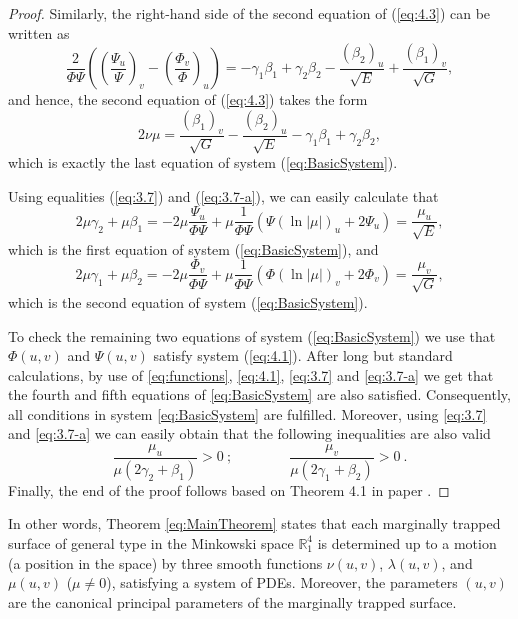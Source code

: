 \documentclass[12pt]{amsart}
\newcommand{\R}{\mathbb R}
\theoremstyle{definition}
\theoremstyle{remark}
\newcommand{\ds}{\displaystyle}
\numberwithin{equation}{section}
\begin{document}
\begin{proof}
Similarly, the right-hand side of the second equation of (\ref{eq:4.3}) can be written as
\begin{equation*}
	\ds \frac{2}{\Phi\Psi} \left( \left(\frac{\Psi_u}{\Psi} \right)_v - \left(\frac{\Phi_v}{\Phi} \right)_u \right)
	= -\gamma_1\beta_1 + \gamma_2\beta_2 - \frac{(\beta_2)_u}{\sqrt E} + \frac{(\beta_1)_v}{\sqrt G},
\end{equation*}
and hence,  the second equation of (\ref{eq:4.3}) takes the form
$$
2\nu\mu  = \frac{(\beta_1)_v}{\sqrt G} - \frac{(\beta_2)_u}{\sqrt E} -\gamma_1\beta_1 + \gamma_2\beta_2, 
$$
which is exactly the last equation of system (\ref{eq:BasicSystem}).

Using equalities (\ref{eq:3.7}) and (\ref{eq:3.7-a}), we can easily calculate that
$$
2\mu \gamma_2 + \mu \beta_1 = -2 \mu \frac{\Psi_u}{\Phi \Psi} +\mu  \frac{1}{\Phi \Psi} \left(\Psi (\ln |\mu|)_u + 2\Psi_u \right) = \frac{\mu_u}{\sqrt{E}}, 
$$
which is the first equation of system (\ref{eq:BasicSystem}),
and 
$$
2\mu \gamma_1 + \mu \beta_2 = -2 \mu \frac{\Phi_v}{\Phi \Psi} +\mu  \frac{1}{\Phi \Psi} \left(\Phi (\ln |\mu|)_v + 2\Phi_v \right) = \frac{\mu_v}{\sqrt{G}}, 
$$
which is the second equation of system (\ref{eq:BasicSystem}).

To check the remaining two equations of system (\ref{eq:BasicSystem}) we use that $\Phi(u,v)$ and $\Psi(u,v)$  satisfy system  (\ref{eq:4.1}). After long but standard calculations, by use of \eqref{eq:functions}, \eqref{eq:4.1}, \eqref{eq:3.7} and \eqref{eq:3.7-a} we get that the fourth and fifth equations of 
\eqref{eq:BasicSystem} are also satisfied. Consequently, all conditions  in system \eqref{eq:BasicSystem} are fulfilled. 
Moreover, using  \eqref{eq:3.7} and \eqref{eq:3.7-a}  we can easily obtain that  the following inequalities are also valid
$$
\frac{\mu_u}{\mu(2\gamma_2+\beta_1)}>0 \ ;  \qquad\qquad
\frac{\mu_v}{\mu(2\gamma_1+\beta_2)}>0 \ .
$$
Finally, the end of the proof follows based on Theorem 4.1 in paper \cite{G-M-JMP-2012}.

\end{proof}


In other words, Theorem \ref{eq:MainTheorem} states that each marginally trapped surface of general type in the Minkowski space $\R^4_1$ is determined up to a motion (a position in the space)  by three smooth functions 
$\nu(u,v)$, $\lambda(u,v)$, and  $\mu(u,v)$ ($\mu \neq 0$), satisfying a system of PDEs. Moreover, the parameters $(u,v)$ are the canonical principal parameters of the marginally trapped surface.
\end{document}
